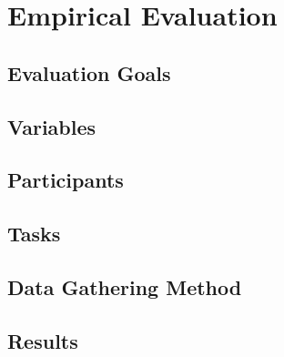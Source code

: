 \chapter{Empirical Evaluation}


\section{Evaluation Goals}

\section{Variables}

\section{Participants}

\section{Tasks}

\section{Data Gathering Method}

\section{Results}

